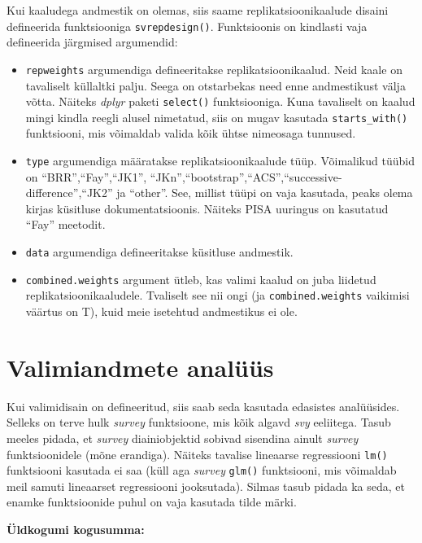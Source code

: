 \documentclass[
]{book}
\providecommand{\tightlist}{%
  \setlength{\itemsep}{0pt}\setlength{\parskip}{0pt}}
\begin{document}
Kui kaaludega andmestik on olemas, siis saame replikatsioonikaalude disaini defineerida funktsiooniga \texttt{svrepdesign()}. Funktsioonis on kindlasti vaja defineerida järgmised argumendid:

\begin{itemize}
\tightlist
\item
  \texttt{repweights} argumendiga defineeritakse replikatsioonikaalud. Neid kaale on tavaliselt küllaltki palju. Seega on otstarbekas need enne andmestikust välja võtta. Näiteks \emph{dplyr} paketi \texttt{select()} funktsiooniga. Kuna tavaliselt on kaalud mingi kindla reegli alusel nimetatud, siis on mugav kasutada \texttt{starts\_with()} funktsiooni, mis võimaldab valida kõik ühtse nimeosaga tunnused.
\item
  \texttt{type} argumendiga määratakse replikatsioonikaalude tüüp. Võimalikud tüübid on ``BRR'',``Fay'',``JK1'', ``JKn'',``bootstrap'',``ACS'',``successive-difference'',``JK2'' ja ``other''. See, millist tüüpi on vaja kasutada, peaks olema kirjas küsitluse dokumentatsioonis. Näiteks PISA uuringus on kasutatud ``Fay'' meetodit.
\item
  \texttt{data} argumendiga defineeritakse küsitluse andmestik.
\item
  \texttt{combined.weights} argument ütleb, kas valimi kaalud on juba liidetud replikatsioonikaaludele. Tvaliselt see nii ongi (ja \texttt{combined.weights} vaikimisi väärtus on T), kuid meie isetehtud andmestikus ei ole.
\end{itemize}

\hypertarget{valimiandmete-analuxfcuxfcs}{%
\section{Valimiandmete analüüs}\label{valimiandmete-analuxfcuxfcs}}

Kui valimidisain on defineeritud, siis saab seda kasutada edasistes analüüsides. Selleks on terve hulk \emph{survey} funktsioone, mis kõik algavd \emph{svy} eeliitega. Tasub meeles pidada, et \emph{survey} diainiobjektid sobivad sisendina ainult \emph{survey} funktsioonidele (mõne erandiga). Näiteks tavalise lineaarse regressiooni \texttt{lm()} funktsiooni kasutada ei saa (küll aga \emph{survey} \texttt{glm()} funktsiooni, mis võimaldab meil samuti lineaarset regressiooni jooksutada). Silmas tasub pidada ka seda, et enamke funktsioonide puhul on vaja kasutada tilde märki.

\textbf{Üldkogumi kogusumma:}
\end{document}
